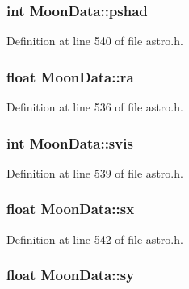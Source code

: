 \hypertarget{struct_moon_data_aa7bc2863bec73b5fff8da2801aaaf94a}{
\subsubsection[{pshad}]{\setlength{\rightskip}{0pt plus 5cm}int Moon\-Data\-::pshad}}\label{struct_moon_data_aa7bc2863bec73b5fff8da2801aaaf94a}


Definition at line 540 of file astro.\-h.

\hypertarget{struct_moon_data_a3421e5d46efb7f485229ca92e34d07f2}{
\subsubsection[{ra}]{\setlength{\rightskip}{0pt plus 5cm}float Moon\-Data\-::ra}}\label{struct_moon_data_a3421e5d46efb7f485229ca92e34d07f2}


Definition at line 536 of file astro.\-h.

\hypertarget{struct_moon_data_a773e32d49166a22e7a4360dc5839378a}{
\subsubsection[{svis}]{\setlength{\rightskip}{0pt plus 5cm}int Moon\-Data\-::svis}}\label{struct_moon_data_a773e32d49166a22e7a4360dc5839378a}


Definition at line 539 of file astro.\-h.

\hypertarget{struct_moon_data_a5dd6074e04eef9733b4cf35ec2be9b15}{
\subsubsection[{sx}]{\setlength{\rightskip}{0pt plus 5cm}float Moon\-Data\-::sx}}\label{struct_moon_data_a5dd6074e04eef9733b4cf35ec2be9b15}


Definition at line 542 of file astro.\-h.

\hypertarget{struct_moon_data_a1481727f5f0a7a2014ee88ee94e03b02}{
\subsubsection[{sy}]{\setlength{\rightskip}{0pt plus 5cm}float Moon\-Data\-::sy}}\label{struct_moon_data_a1481727f5f0a7a2014ee88ee94e03b02}


